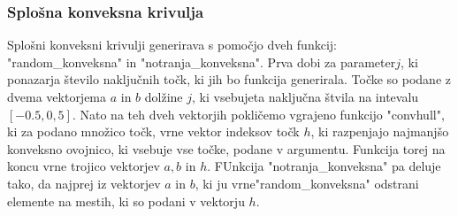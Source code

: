 \documentclass[a4paper]{article}
\begin{document}
\subsubsection{Splošna  konveksna krivulja}
Splošni konveksni krivulji generirava s pomočjo dveh funkcij: "random\_konveksna" in "notranja_konveksna". Prva dobi za parameter$j$, ki ponazarja število naključnih točk, ki jih bo funkcija generirala. Točke so podane z dvema vektorjema $a$ in $b$ dolžine $j$, ki vsebujeta naključna štvila na intevalu $[-0.5,0,5]$. Nato na teh dveh vektorjih pokličemo vgrajeno funkcijo "convhull", ki za podano množico točk, vrne vektor indeksov točk $h$, ki razpenjajo  najmanjšo konveksno ovojnico, ki vsebuje vse točke, podane v argumentu. Funkcija torej na koncu vrne trojico vektorjev $a,b$ in $h$. FUnkcija "notranja\_konveksna" pa deluje tako, da najprej iz vektorjev $a$ in $b$, ki ju vrne"random\_konveksna" odstrani elemente na mestih, ki so podani v vektorju $h$. 
\end{document}
